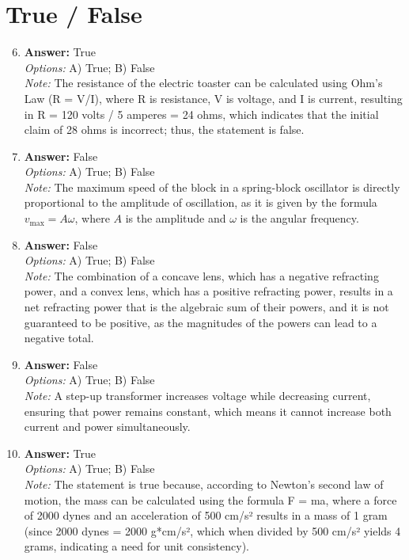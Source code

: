 \documentclass[12pt]{article}
\begin{document}
\section*{True / False}
\begin{enumerate}[label=\arabic*.]
\setcounter{enumi}{5}
\item \textbf{Answer:} True
\\ \textit{Options:} A) True; B) False
\\ \textit{Note:} The resistance of the electric toaster can be calculated using Ohm's Law (R = V/I), where R is resistance, V is voltage, and I is current, resulting in R = 120 volts / 5 amperes = 24 ohms, which indicates that the initial claim of 28 ohms is incorrect; thus, the statement is false.
\item \textbf{Answer:} False
\\ \textit{Options:} A) True; B) False
\\ \textit{Note:} The maximum speed of the block in a spring-block oscillator is directly proportional to the amplitude of oscillation, as it is given by the formula \( v_{\text{max}} = A \omega \), where \( A \) is the amplitude and \( \omega \) is the angular frequency.
\item \textbf{Answer:} False
\\ \textit{Options:} A) True; B) False
\\ \textit{Note:} The combination of a concave lens, which has a negative refracting power, and a convex lens, which has a positive refracting power, results in a net refracting power that is the algebraic sum of their powers, and it is not guaranteed to be positive, as the magnitudes of the powers can lead to a negative total.
\item \textbf{Answer:} False
\\ \textit{Options:} A) True; B) False
\\ \textit{Note:} A step-up transformer increases voltage while decreasing current, ensuring that power remains constant, which means it cannot increase both current and power simultaneously.
\item \textbf{Answer:} True
\\ \textit{Options:} A) True; B) False
\\ \textit{Note:} The statement is true because, according to Newton's second law of motion, the mass can be calculated using the formula F = ma, where a force of 2000 dynes and an acceleration of 500 cm/s² results in a mass of 1 gram (since 2000 dynes = 2000 g*cm/s², which when divided by 500 cm/s² yields 4 grams, indicating a need for unit consistency).
\end{enumerate}
\end{document}
